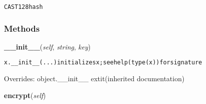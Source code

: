 \begin{alltt}
CAST 128 hash 
\end{alltt}



  \subsubsection{Methods}

    \vspace{0.5ex}

\hspace{.8\funcindent}\begin{boxedminipage}{\funcwidth}

    \raggedright \textbf{\_\_init\_\_}(\textit{self}, \textit{string}, \textit{key})

\setlength{\parskip}{2ex}
\begin{alltt}
x.\_\_init\_\_(...) initializes x; see help(type(x)) for signature
\end{alltt}

\setlength{\parskip}{1ex}
      Overrides: object.\_\_init\_\_ 	extit{(inherited documentation)}

    \end{boxedminipage}

    \label{hal:maths:crypt:CAST128:encrypt}

    \vspace{0.5ex}

\hspace{.8\funcindent}\begin{boxedminipage}{\funcwidth}

    \raggedright \textbf{encrypt}(\textit{self})

\setlength{\parskip}{2ex}
\setlength{\parskip}{1ex}
    \end{boxedminipage}

    \label{hal:maths:crypt:CAST128:decrypt}

